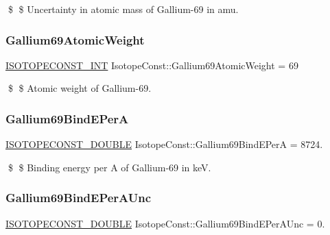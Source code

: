 \$ \$ Uncertainty in atomic mass of Gallium-\/69 in amu. \mbox{\label{group___isotope_const-_gallium-_ga69_gab3f191392c7cd52bc960f66df67f38e9}} 
\subsubsection{\texorpdfstring{Gallium69\+Atomic\+Weight}{Gallium69AtomicWeight}}
{\footnotesize\ttfamily \mbox{\hyperlink{group___isotope_const-_macros_ga5f18360b3e99483a35c32d789e62621c}{I\+S\+O\+T\+O\+P\+E\+C\+O\+N\+S\+T\+\_\+\+I\+NT}} Isotope\+Const\+::\+Gallium69\+Atomic\+Weight = 69}

\$ \$ Atomic weight of Gallium-\/69. \mbox{\label{group___isotope_const-_gallium-_ga69_ga466ee8064d9bc4b7a257924ecef55413}} 
\subsubsection{\texorpdfstring{Gallium69\+Bind\+E\+PerA}{Gallium69BindEPerA}}
{\footnotesize\ttfamily \mbox{\hyperlink{group___isotope_const-_macros_ga8f45a7272ce02c0b4c65c44636ed719a}{I\+S\+O\+T\+O\+P\+E\+C\+O\+N\+S\+T\+\_\+\+D\+O\+U\+B\+LE}} Isotope\+Const\+::\+Gallium69\+Bind\+E\+PerA = 8724.}

\$ \$ Binding energy per A of Gallium-\/69 in keV. \mbox{\label{group___isotope_const-_gallium-_ga69_ga6ef48c87fca5f64c184160dd2a13c5a2}} 
\subsubsection{\texorpdfstring{Gallium69\+Bind\+E\+Per\+A\+Unc}{Gallium69BindEPerAUnc}}
{\footnotesize\ttfamily \mbox{\hyperlink{group___isotope_const-_macros_ga8f45a7272ce02c0b4c65c44636ed719a}{I\+S\+O\+T\+O\+P\+E\+C\+O\+N\+S\+T\+\_\+\+D\+O\+U\+B\+LE}} Isotope\+Const\+::\+Gallium69\+Bind\+E\+Per\+A\+Unc = 0.}

